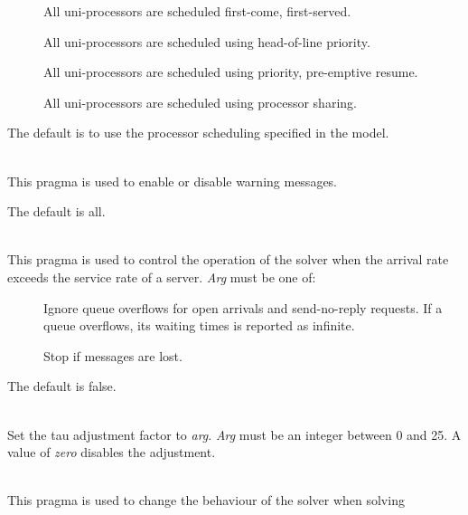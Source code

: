 \begin{description}
\begin{description}
\item[]
All uni-processors are scheduled first-come, first-served.
\item[]
All uni-processors are scheduled using head-of-line priority.
\item[]
All uni-processors are scheduled using priority, pre-emptive resume.
\item[]
All uni-processors are scheduled using processor sharing.
\end{description}
The default is to use the processor scheduling specified in the model.

\item[\optarg{severity-level}{=\emph{arg}}]~\\
This pragma is used to enable or disable warning messages.
\begin{description}
\item[]
\item[]
\item[]
\item[]
\end{description}
The default is all.
\item[\optarg{stop-on-message-loss}{=\emph{arg}}]~\\
This pragma is used to control the operation of the solver when the
arrival rate exceeds the service rate of a server.
\emph{Arg} must be one of: 
\begin{description}
\item[]
Ignore queue overflows for open arrivals and send-no-reply requests.  If a queue overflows, its waiting times is reported as infinite.\item[]
Stop if messages are lost.
\end{description}
The default is false.
\item[\optarg{tau}{=\emph{arg}}]~\\
Set the tau adjustment factor to \emph{arg}.
\emph{Arg} must be an integer between 0 and 25.
A value of \emph{zero} disables the adjustment.
\item[\optarg{threads}{=\emph{arg}}]~\\
This pragma is used to change the behaviour of the solver when solving

\end{description}
